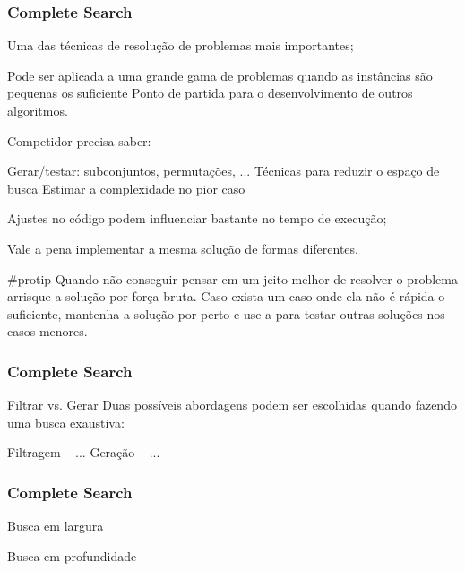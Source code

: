 \begin{frame}
\frametitle{Complete Search}

\begin{block}{}
\begin{itemize}
	\bitem Uma das técnicas de resolução de problemas mais importantes;
	\begin{itemize}
		\bitem Pode ser aplicada a uma grande gama de problemas quando as instâncias são pequenas os suficiente
		\bitem Ponto de partida para o desenvolvimento de outros algoritmos.
	\end{itemize}
	\bitem Competidor precisa saber:
	\begin{itemize}
		\bitem Gerar/testar: subconjuntos, permutações, ...
		\bitem Técnicas para reduzir o espaço de busca
		\bitem Estimar a complexidade no pior caso
	\end{itemize}
	\bitem Ajustes no código podem influenciar bastante no tempo de execução;
	\begin{itemize}
		\bitem Vale a pena implementar a mesma solução de formas diferentes.
	\end{itemize}
\end{itemize}	
\end{block}

\begin{block}{\tiny \#protip}
Quando não conseguir pensar em um jeito melhor de resolver o problema arrisque a solução por força bruta.
Caso exista um caso onde ela não é rápida o suficiente, mantenha a solução por perto e use-a para testar outras soluções nos casos menores.
\end{block}
\end{frame}

\begin{frame}
\frametitle{Complete Search}
\begin{block}{Filtrar vs. Gerar }
Duas possíveis abordagens podem ser escolhidas quando fazendo uma busca exaustiva:
\begin{itemize}
	\bitem Filtragem -- ...
	\bitem Geração -- ...
\end{itemize}
\end{block}
\end{frame}

\begin{frame}
\frametitle{Complete Search}
\begin{block}{Busca em largura }
\end{block}

\begin{block}{Busca em profundidade}
\end{block}
\end{frame}


